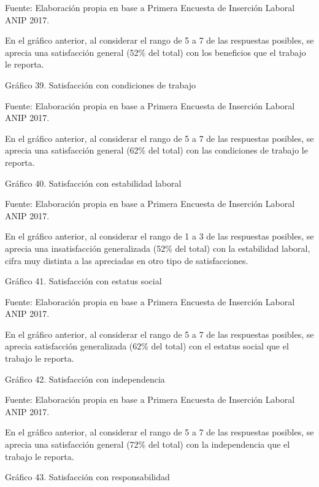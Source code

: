 \documentclass{article}
\begin{document}
Fuente: Elaboración propia en base a Primera Encuesta de Inserción Laboral ANIP 2017.

En el gráfico anterior, al considerar el rango de 5 a 7 de las respuestas posibles, se aprecia una satisfacción general (52\% del total) con los beneficios que el trabajo le reporta.

Gráfico 39. Satisfacción con condiciones de trabajo


Fuente: Elaboración propia en base a Primera Encuesta de Inserción Laboral ANIP 2017.

En el gráfico anterior, al considerar el rango de 5 a 7 de las respuestas posibles, se aprecia una satisfacción general (62\% del total) con las condiciones de trabajo le reporta.

Gráfico 40. Satisfacción con estabilidad laboral


Fuente: Elaboración propia en base a Primera Encuesta de Inserción Laboral ANIP 2017.

En el gráfico anterior, al considerar el rango de 1 a 3 de las respuestas posibles, se aprecia una insatisfacción generalizada (52\% del total) con la estabilidad laboral, cifra muy distinta a las apreciadas en otro tipo de satisfacciones.

Gráfico 41. Satisfacción con estatus social


Fuente: Elaboración propia en base a Primera Encuesta de Inserción Laboral ANIP 2017.

En el gráfico anterior, al considerar el rango de 5 a 7 de las respuestas posibles, se aprecia satisfacción generalizada (62\% del total) con el estatus social que el trabajo le reporta.

Gráfico 42. Satisfacción con independencia


Fuente: Elaboración propia en base a Primera Encuesta de Inserción Laboral ANIP 2017.

En el gráfico anterior, al considerar el rango de 5 a 7 de las respuestas posibles, se aprecia una satisfacción general (72\% del total) con la independencia que el trabajo le reporta.

Gráfico 43. Satisfacción con responsabilidad
\end{document}
